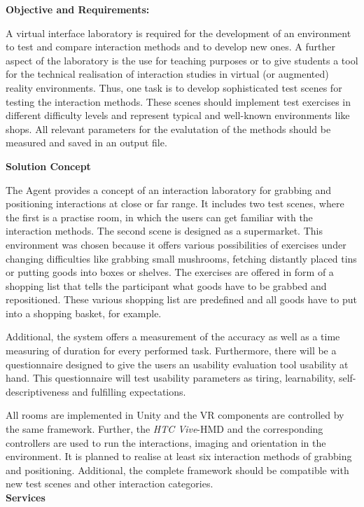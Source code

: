 \documentclass[a4paper, 12pt]{article}
\begin{document}
\textbf{Objective and Requirements:}

A virtual interface laboratory is required for the development of an environment to test and compare interaction methods and to develop new ones. A further aspect of the laboratory is the use for teaching purposes or to give students a tool for the technical realisation of interaction studies in virtual (or augmented) reality environments. Thus, one task is to develop sophisticated test scenes for testing the interaction methods. These scenes should implement test exercises in different difficulty levels and represent typical and well-known environments like shops. All relevant parameters for the evalutation of the methods should be measured and saved in an output file.

\textbf{Solution Concept}
 
  The Agent provides a concept of an interaction laboratory for grabbing and positioning interactions at close or far range. It includes two test scenes, where the first is a practise room, in which the users can get familiar with the interaction methods. The second scene is designed as a supermarket. This environment was chosen because it offers various possibilities of exercises under changing difficulties like grabbing small mushrooms, fetching distantly placed tins or putting goods into boxes or shelves. The exercises are offered in form of a shopping list that tells the participant what goods have to be grabbed and repositioned. These various shopping list are predefined and all goods have to put into a shopping basket, for example. 
  
  Additional, the system offers a measurement of the accuracy as well as a time measuring of duration for every performed task. Furthermore, there will be a questionnaire designed to give the users an usability evaluation tool usability at hand. This questionnaire will test usability parameters as tiring, learnability, self-descriptiveness and fulfilling expectations.
 
 All rooms are implemented in Unity and the VR components are controlled by the same framework. Further, the \textit{HTC Vive}-HMD and the corresponding controllers are used to run the interactions, imaging and orientation in the environment. It is planned to realise at least six interaction methods of grabbing and positioning. Additional, the complete framework should be compatible with new test scenes and other interaction categories. \\

 
\textbf{Services}
\end{document}

